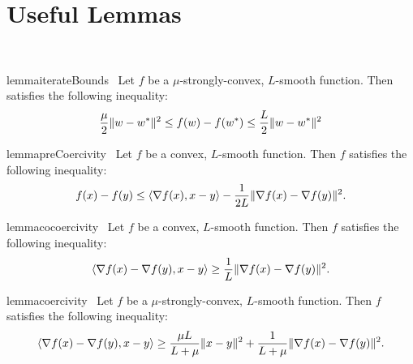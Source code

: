 
\section{Useful Lemmas}~\label{app:useful-lemmas}

\begin{restatable}{lemma}{iterateBounds}~\label{lemma:iterate-bounds}
    Let \( f \) be a \( \mu \)-strongly-convex, \( L \)-smooth function. Then satisfies the following inequality:
    \[ \frac{\mu}{2} \|w - w^*\|^2 \leq f(w) - f(w^*) \leq \frac{L}{2} \|w - w^*\|^2 \]
\end{restatable}


\begin{restatable}{lemma}{preCoercivity}~\label{lemma:pre-coercivity}
    Let \( f  \) be a convex, \( L  \)-smooth function. 
    Then \( f  \) satisfies the following inequality:
    \[ f(x) - f(y)  \leq  \left\langle\nabla f(x), x - y\right\rangle- \frac{1}{2L} \|\nabla f(x) - \nabla f(y)\|^2. \] 
\end{restatable}


\begin{restatable}{lemma}{cocoercivity}~\label{lemma:co-coercivity}
    Let \( f  \) be a convex, \( L  \)-smooth function. 
    Then \( f  \) satisfies the following inequality:
    \[ \left\langle\nabla f(x) - \nabla f(y), x - y\right\rangle \geq \frac{1}{L} \|\nabla f(x) - \nabla f(y)\|^2. \] 
\end{restatable}


\begin{restatable}{lemma}{coercivity}~\label{lemma:coercivity}
    Let \( f  \) be a \( \mu  \)-strongly-convex, \( L  \)-smooth function. 
    Then \( f  \) satisfies the following inequality:
    \[ \left\langle\nabla f(x) - \nabla f(y), x - y\right\rangle \geq \frac{\mu L}{L + \mu}\|x - y\|^2 + \frac{1}{L + \mu} \|\nabla f(x) - \nabla f(y)\|^2.  \] 
\end{restatable}

